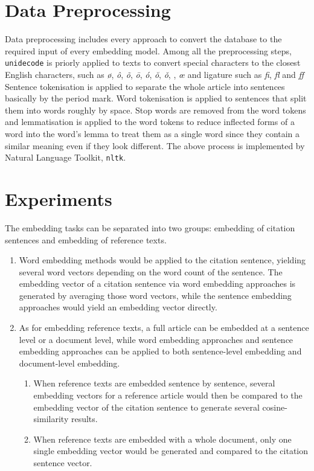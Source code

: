 \section{Data Preprocessing}
Data preprocessing includes every approach to convert the database to the required input of every embedding model.
Among all the preprocessing steps, \texttt{unidecode} is priorly applied to texts to convert special characters to the closest English characters, such as \textit{\o}, \textit{\^o}, \textit{\~o}, \textit{\=o}, \textit{\'o}, \textit{\u o}, \textit{\v o}, \textit{\oo}, \textit{\oe} and ligature such as \textit{fi}, \textit{fl} and \textit{ff}
Sentence tokenisation is applied to separate the whole article into sentences basically by the period mark.
Word tokenisation is applied to sentences that split them into words roughly by space.
Stop words are removed from the word tokens and lemmatisation is applied to the word tokens to reduce inflected forms of a word into the word's lemma to treat them as a single word since they contain a similar meaning even if they look different.
The above process is implemented by Natural Language Toolkit, \texttt{nltk}.

\section{Experiments}
The embedding tasks can be separated into two groups: embedding of citation sentences and embedding of reference texts.

\begin{enumerate}
    \item Word embedding methods would be applied to the citation sentence, yielding several word vectors depending on the word count of the sentence.
    The embedding vector of a citation sentence via word embedding approaches is generated by averaging those word vectors, while the sentence embedding approaches would yield an embedding vector directly.
    \item As for embedding reference texts, a full article can be embedded at a sentence level or a document level, while word embedding approaches and sentence embedding approaches can be applied to both sentence-level embedding and document-level embedding.
    \begin{enumerate}
        \item When reference texts are embedded sentence by sentence, several embedding vectors for a reference article would then be compared to the embedding vector of the citation sentence to generate several cosine-similarity results.
        \item When reference texts are embedded with a whole document, only one single embedding vector would be generated and compared to the citation sentence vector.
    \end{enumerate}
\end{enumerate}

